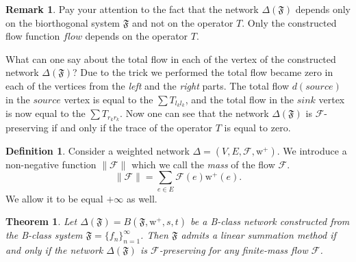 \documentclass[12pt]{article}
\newtheorem{theorem}{Theorem}
\theoremstyle{definition}
\newtheorem{remark}{Remark}
\newtheorem{definition}{Definition}
\newcommand{\seq}[1]{\{{#1}_n\}_{n=1}^\infty}
\newcommand{\fsys}{\mathfrak{F}}
\newcommand{\wtp}{\mathrm{w}^{+}}
\newcommand{\flow}{\mathcal{F}}
\newcommand{\flowsgn}{\flow}
\newcommand{\source}{\mathit{source}}
\newcommand{\sink}{\mathit{sink}}
\newcommand{\net}{\Delta}
\newcommand{\onet}{\vec{\Delta}}
\numberwithin{remark}{section}
\numberwithin{theorem}{section}
\numberwithin{prop}{section}
\numberwithin{equation}{section}
\numberwithin{lemma}{section}
\numberwithin{prop_under_lemma}{lemma}
\begin{document}
    \begin{remark}
      Pay your attention to the fact that the network $\net(\fsys)$
      depends only on the biorthogonal system $\fsys$ and not on the operator $T$.
      Only the constructed flow function $flow$ depends on the operator $T$.
    \end{remark}
    What can one say about the total flow in each of the vertex of the constructed network $\net(\fsys)$?
    Due to the trick we performed the total flow became zero in each of the vertices from the \textit{left} and the \textit{right} parts.
    The total flow $d(\source)$ in the $\source$ vertex is equal to the $\sum T_{l_k l_k}$, and the total flow in the
    $\sink$ vertex is now equal to the $\sum T_{r_k r_k}$.
    Now one can see that the network $\net(\fsys)$ is $\flow$-preserving if and only if the trace of the operator $T$ is equal to
    zero.
    \begin{definition}
      Consider a weighted network $\net = (V, E, \flow, \wtp)$.
      We introduce a non-negative function $\|\flow\|$ which we call the \emph{mass} of the flow $\flow$.
      $$
        \|\flow\| = \sum_{e \in E} \flow(e) \wtp(e).
      $$
      We allow it to be equal $+\infty$ as well.
    \end{definition}
    \begin{theorem}
      \label{thm-graph-eq}
        Let $\net(\fsys) = B(\fsys, \wtp, s, t)$ be a B-class network constructed
          from the B-class system $\fsys = \seq{f}$.
        Then $\fsys$ admits a linear summation method if and only if
          the network $\net(\fsys)$ is $\flow$-preserving for any
          finite-mass flow $\flow$.
    \end{theorem}
\end{document}
